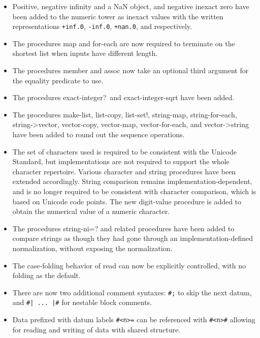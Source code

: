 \begin{itemize}
\item Positive, negative infinity and a NaN object, and negative inexact zero have been added
to the numeric tower as inexact values with the written
representations {\tt +inf.0}, {\tt -inf.0}, {\tt +nan.0}, and {}
respectively.

\item The procedures {\cf map} and {\cf for-each} are now required to terminate on
the shortest list when inputs have different length.

\item The procedures {\cf member} and {\cf assoc} now take an optional third argument
for the equality predicate to use.

\item The procedures {\cf exact-integer?}\  and {\cf exact-integer-sqrt} have been added.

\item The procedures {\cf make-list}, {\cf list-copy}, {\cf list-set!}, {\cf
string-map}, {\cf string-for-each}, {\cf string->vector}, {\cf
vector-copy}, {\cf vector-map}, {\cf vector-for-each}, and {\cf
vector->string} have been added to round out the sequence operations.

\item The set of characters used is required to be consistent with the
Unicode Standard, 
but implementations are not required to support the whole character repertoire.
Various character and string procedures have been extended accordingly.
String comparison remains implementation-dependent, and is no longer
required to be consistent with character comparison, which is based
on Unicode code points.
The new {\cf digit-value} procedure is added to obtain the numerical
value of a numeric character.

\item The procedures {\cf string-ni=?} and related procedures have been added to
compare strings as though they had gone through an
implementation-defined normalization, without exposing the
normalization.

\item The case-folding behavior of {\cf read} can now be explicitly
controlled, with no folding as the default.

\item There are now two additional comment syntaxes: {\tt \#;} to
skip the next datum, and {\tt \#| ... |\#}
for nestable block comments.

\item Data prefixed with datum labels {\tt \#<n>=} can be referenced
with {\tt \#<n>\#} allowing for reading and writing of data with
shared structure.


\end{itemize}
